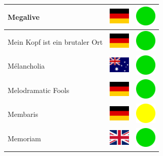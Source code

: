\documentclass[12pt, a4paper, twoside]{report}
\begin{document}
\begin{center}
\begin{longtable}{|p{5cm}|p{2cm}|p{2cm}|}
 Megalive                                                   & \includegraphics[width=1cm]{../img/flags/de} &   \includegraphics[width=1cm]{../likes/y} \\ \hline
 Mein Kopf ist ein brutaler Ort                             & \includegraphics[width=1cm]{../img/flags/de} &   \includegraphics[width=1cm]{../likes/y} \\ \hline
 Mélancholia                                                & \includegraphics[width=1cm]{../img/flags/au} &   \includegraphics[width=1cm]{../likes/y} \\ \hline
 Melodramatic Fools                                         & \includegraphics[width=1cm]{../img/flags/de} &   \includegraphics[width=1cm]{../likes/y} \\ \hline
 Membaris                                                   & \includegraphics[width=1cm]{../img/flags/de} &   \includegraphics[width=1cm]{../likes/m} \\ \hline
 Memoriam                                                   & \includegraphics[width=1cm]{../img/flags/gb} &   \includegraphics[width=1cm]{../likes/y} \\ \hline

\end{longtable}
\end{center}
\end{document}
